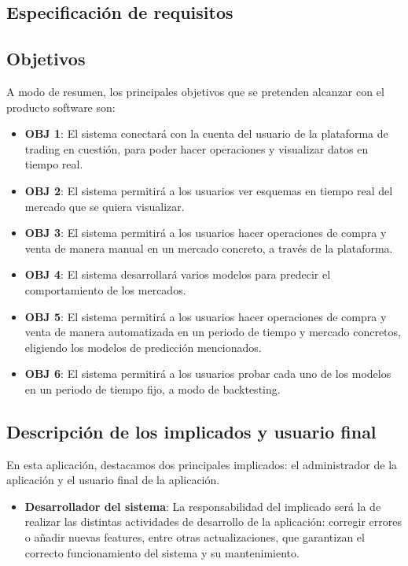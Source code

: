 \begin{titlepage}
	
\chapter{Especificación de requisitos}

\section{Objetivos}

A modo de resumen, los principales objetivos que se pretenden alcanzar con el producto software
son:

\begin{itemize}
	
	\item \textbf{OBJ 1}: El sistema conectará con la cuenta del usuario de la plataforma de trading en cuestión, para poder hacer operaciones y visualizar datos en tiempo real.
	\item \textbf{OBJ 2}: El sistema permitirá a los usuarios ver esquemas en tiempo real del mercado que se quiera visualizar.
	\item \textbf{OBJ 3}: El sistema permitirá a los usuarios hacer operaciones de compra y venta de manera manual en un mercado concreto, a través de la plataforma.
	\item \textbf{OBJ 4}: El sistema desarrollará varios modelos para predecir el comportamiento de los mercados.
	\item \textbf{OBJ 5}: El sistema permitirá a los usuarios hacer operaciones de compra y venta de manera automatizada en un periodo de tiempo y mercado concretos, eligiendo los modelos de predicción mencionados.
	\item \textbf{OBJ 6}: El sistema permitirá a los usuarios probar cada uno de los modelos en un periodo de tiempo fijo, a modo de backtesting.
	
\end{itemize}

\section{Descripción de los implicados y usuario final}

En esta aplicación, destacamos dos principales implicados: el administrador de la aplicación y el usuario final de la aplicación.

\begin{itemize}
	\item \textbf{Desarrollador del sistema}: La responsabilidad del implicado será la de realizar las distintas actividades de desarrollo de la aplicación: corregir errores o añadir nuevas features, entre otras actualizaciones, que garantizan el correcto funcionamiento del sistema y su mantenimiento.
	

\end{itemize}
\end{titlepage}
